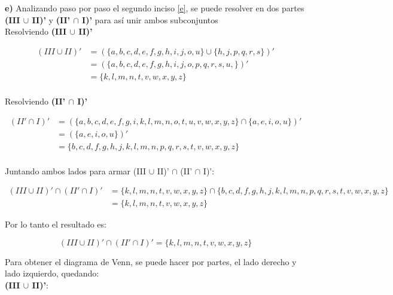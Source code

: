 \newpage

\textbf{e)} Analizando paso por paso el segundo inciso \ref{e}, se puede resolver en dos partes \textbf{(III $\cup$ II)'} y \textbf{(II' $\cap$ I)' } para así unir ambos subconjuntos \\

Resolviendo \textbf{(III $\cup$ II)' }

\begin{align*}
(III \cup II)'   &= (\{ a, b, c, d, e, f, g, h, i, j, o, u  \}  \cup \{ h, j, p, q, r, s  \})' \\
  &=    (\{ a, b, c, d, e, f, g, h, i, j, o, p, q, r, s, u, \})'      \\
  &=   \{  k, l, m, n, t, v, w, x, y, z \}      \\
\end{align*}

Resolviendo \textbf{(II' $\cap$ I)' }

\begin{align*}
(II' \cap I)'   &= ( \{ a, b, c, d, e, f, g, i, k, l, m, n, o, t, u, v, w, x, y, z \} \cap \{a, e, i, o, u\} )' \\
  &=    (\{a, e, i, o, u\})'      \\
  &=  \{ b, c, d, f, g, h, j, k, l, m, n, p, q, r, s, t, v, w, x, y, z \}      \\
\end{align*}

Juntando ambos lados para armar (III $\cup$ II)' $\cap$ (II' $\cap$ I)':

\begin{align*}
(III \cup II)' \cap (II' \cap I)'  &= \{  k, l, m, n, t, v, w, x, y, z \} \cap \{ b, c, d, f, g, h, j, k, l, m, n, p, q, r, s, t, v, w, x, y, z \}  \\
  &= \{ k, l, m, n, t,  v, w, x, y, z \}
\end{align*}

Por lo tanto el resultado es:

\begin{equation*}
    \boxed{(III \cup II)' \cap (II' \cap I)'  =   \{ k, l, m, n, t,  v, w, x, y, z \}   }
\end{equation*}



Para obtener el diagrama de Venn, se puede hacer por partes, el lado derecho y lado izquierdo, quedando: \\

\textbf{(III $\cup$ II)'}: 

